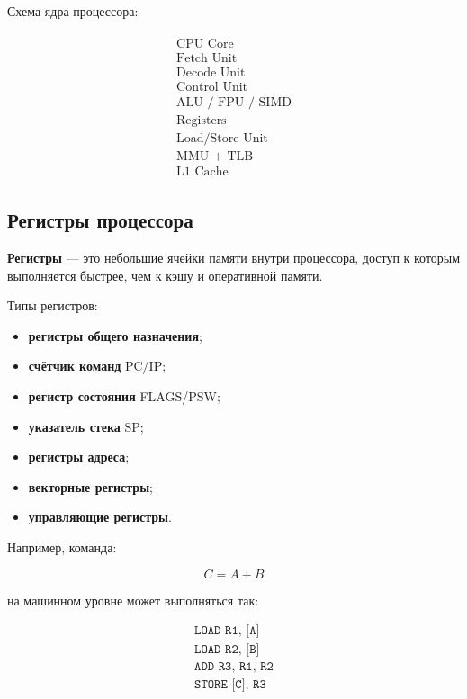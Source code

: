 \documentclass[12pt,a4paper]{article}
\theoremstyle{remark}
\begin{document}
Схема ядра процессора:

\[
\begin{array}{c}
\boxed{
\begin{array}{c}
\text{CPU Core} \\[0.5em]
\boxed{\text{Fetch Unit}} \\
\boxed{\text{Decode Unit}} \\
\boxed{\text{Control Unit}} \\
\boxed{\text{ALU / FPU / SIMD}} \\
\boxed{\text{Registers}} \\
\boxed{\text{Load/Store Unit}} \\
\boxed{\text{MMU + TLB}} \\
\boxed{\text{L1 Cache}}
\end{array}}
\end{array}
\]

\subsection{Регистры процессора}

\textbf{Регистры} --- это небольшие ячейки памяти внутри процессора, доступ к которым выполняется быстрее, чем к кэшу и оперативной памяти.

Типы регистров:
\begin{itemize}
    \item \textbf{регистры общего назначения};
    \item \textbf{счётчик команд} PC/IP;
    \item \textbf{регистр состояния} FLAGS/PSW;
    \item \textbf{указатель стека} SP;
    \item \textbf{регистры адреса};
    \item \textbf{векторные регистры};
    \item \textbf{управляющие регистры}.
\end{itemize}

Например, команда:

\[
C = A + B
\]

на машинном уровне может выполняться так:

\[
\begin{array}{l}
\texttt{LOAD R1, [A]} \\
\texttt{LOAD R2, [B]} \\
\texttt{ADD R3, R1, R2} \\
\texttt{STORE [C], R3}
\end{array}
\]
\end{document}
